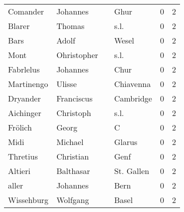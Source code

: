 \begin{center}
\begin{tiny}
\begin{longtabu}{llllrr}
                 Comander &                           Johannes &             &                                        Ghur &          0 &         2 \\
                   Blarer &                             Thomas &             &                                        s.l. &          0 &         2 \\
                     Bars &                              Adolf &             &                                       Wesel &          0 &         2 \\
                     Mont &                        Ohristopher &             &                                        s.l. &          0 &         2 \\
                Fabrlelus &                           Johannes &             &                                        Chur &          0 &         2 \\
               Martinengo &                             Ulisse &             &                                   Chiavenna &          0 &         2 \\
                 Dryander &                         Franciscus &             &                                   Cambridge &          0 &         2 \\
                Aichinger &                          Christoph &             &                                        s.l. &          0 &         2 \\
                  Frölich &                              Georg &             &                                           C &          0 &         2 \\
                     Midi &                            Michael &             &                                      Glarus &          0 &         2 \\
                 Thretius &                          Christian &             &                                        Genf &          0 &         2 \\
                  Altieri &                          Balthasar &             &                                  St. Gallen &          0 &         2 \\
                    aller &                           Johannes &             &                                        Bern &          0 &         2 \\
               Wissehburg &                           Wolfgang &             &                                       Basel &          0 &         2 \\

\end{longtabu}
\end{tiny}
\end{center}
